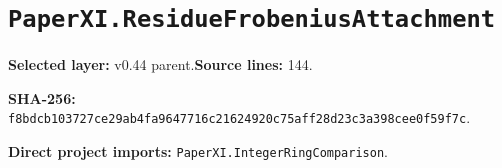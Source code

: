 \documentclass[10pt,oneside]{book}
\begin{document}
\section{\texorpdfstring{\nolinkurl{PaperXI.ResidueFrobeniusAttachment}}{PaperXI.ResidueFrobeniusAttachment}}\label{module:PaperXI.ResidueFrobeniusAttachment}

\textbf{Selected layer:} v0.44 parent.\quad\textbf{Source lines:} 144.\par\textbf{SHA-256:} {\scriptsize\nolinkurl{f8bdcb103727ce29ab4fa9647716c21624920c75aff28d23c3a398cee0f59f7c}}.


\textbf{Direct project imports:} \nolinkurl{PaperXI.IntegerRingComparison}.
\end{document}
